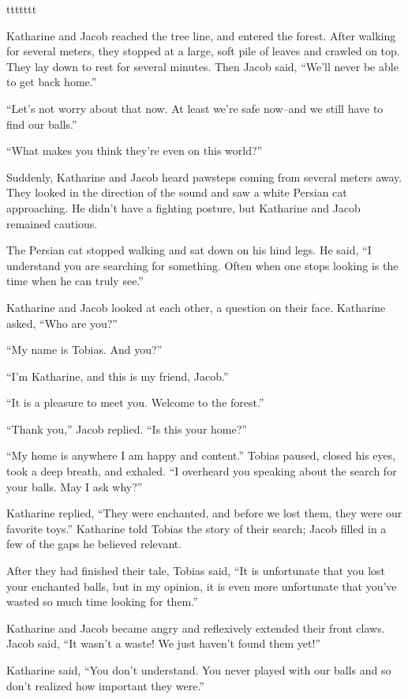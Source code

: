 ttttttt



Katharine and Jacob reached the tree line, and entered the forest. After walking for several meters, they stopped at a large, soft pile of leaves and crawled on top. They lay down to rest for several minutes. Then Jacob said, “We'll never be able to get back home.”

“Let's not worry about that now. At least we're safe now–and we still have to find our balls.”

“What makes you think they're even on this world?”

Suddenly, Katharine and Jacob heard pawsteps coming from several meters away. They looked in the direction of the sound and saw a white Persian cat approaching. He didn't have a fighting posture, but Katharine and Jacob remained cautious.

The Persian cat stopped walking and sat down on his hind legs. He said, “I understand you are searching for something. Often when one stops looking is the time when he can truly see.”

Katharine and Jacob looked at each other, a question on their face. Katharine asked, “Who are you?”

“My name is Tobias. And you?”

“I'm Katharine, and this  is my friend, Jacob.”

“It is a pleasure to meet you. Welcome to the forest.”

“Thank you,” Jacob replied. “Is this your home?”

“My home is anywhere I am happy and content.” Tobias paused, closed his eyes, took a deep breath, and exhaled. “I overheard you speaking about the search for your balls. May I ask why?”

Katharine replied, “They were enchanted, and before we lost them, they were our favorite toys.” Katharine told Tobias the story of their search; Jacob filled in a few of the gaps he believed relevant.

After they had finished their tale, Tobias said, “It is unfortunate that you lost your enchanted balls, but in my opinion, it is even more unfortunate that you've wasted so much time looking for them.”

Katharine and Jacob became angry and reflexively extended their front claws. Jacob said, “It wasn't a waste! We just haven't found them yet!”

Katharine said, “You don't understand. You never played with our balls and so don't realized how important they were.”

